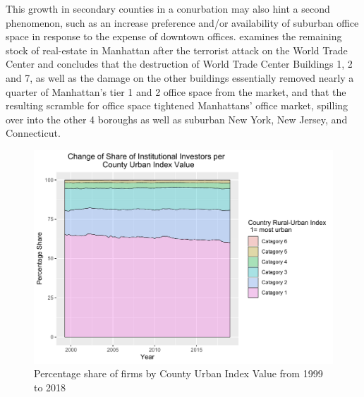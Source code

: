 This growth in secondary counties in a conurbation may also hint a second phenomenon, such as an increase preference and/or availability of suburban office space in response to the expense of downtown offices.  \cite{Pohl2004} examines the remaining stock of real-estate in Manhattan after the terrorist attack on the World Trade Center and concludes that the destruction of World Trade Center Buildings 1, 2 and 7, as well as the damage on the other buildings essentially removed nearly a quarter of Manhattan's tier 1 and 2 office space from the market, and that the resulting scramble for office space tightened Manhattans' office market, spilling over into the other 4 boroughs as well as suburban New York, New Jersey, and Connecticut.  



\begin{figure}
	\centering
	\includegraphics[width=1\linewidth]{Figures/ChapterIII/ChangeInRelativeNumberRuralUrban}
	\caption[Relative Numbers of Institutional Investors Over Time by County Urban-Rural Index]{Percentage share of firms by County Urban Index Value from 1999 to 2018}
	\label{fig:changeinrelativenumberruralurban}
\end{figure}

